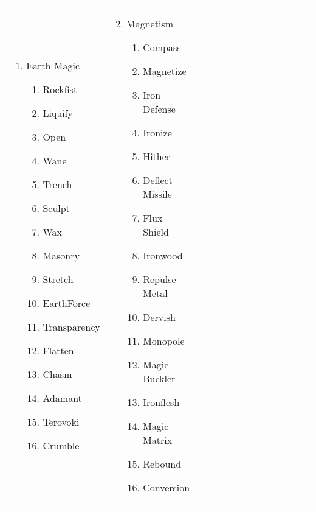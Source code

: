 \renewcommand{\labelenumii}{\arabic{enumii}.}
\begin{tabular}{@{} p{0.25\linewidth} p{0.25\linewidth} p{0.25\linewidth} p{0.25\linewidth}}
\begin{enumerate}
	\item Earth Magic
	\begin{enumerate}
		\item Rockfist
		\item Liquify
		\item Open
		\item Wane
		\item Trench
		\item Sculpt
		\item Wax
		\item Masonry
		\item Stretch
		\item EarthForce
		\item Transparency
		\item Flatten
		\item Chasm
		\item Adamant
		\item Terovoki
		\item Crumble
	\end{enumerate}
\end{enumerate} &
\begin{enumerate}
	\setcounter{enumi}{1}
	\item Magnetism
	\begin{enumerate}
		\item Compass
		\item Magnetize
		\item Iron Defense
		\item Ironize
		\item Hither
		\item Deflect Missile
		\item Flux Shield
		\item Ironwood
		\item Repulse Metal
		\item Dervish
		\item Monopole
		\item Magic Buckler
		\item Ironflesh
		\item Magic Matrix
		\item Rebound
		\item Conversion
	\end{enumerate}
\end{enumerate} &

\end{tabular}
